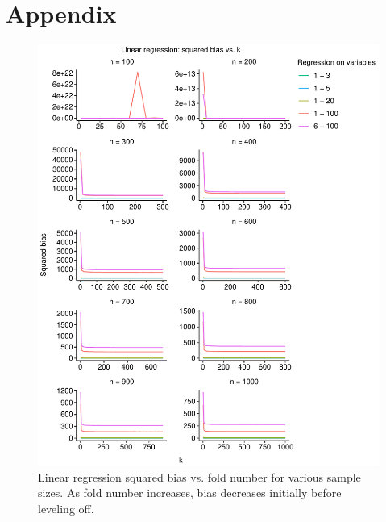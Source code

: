 \documentclass[
  12pt,
]{article}
\begin{document}
\hypertarget{appendix}{%
\section{Appendix}\label{appendix}}

\begin{figure}[H]

{\centering \includegraphics{manuscript_files/figure-latex/unnamed-chunk-1-1} 

}

\caption{Linear regression squared bias vs. fold number for various sample sizes. As fold number increases, bias decreases initially before leveling off.}\label{fig:unnamed-chunk-1}
\end{figure}
\end{document}
